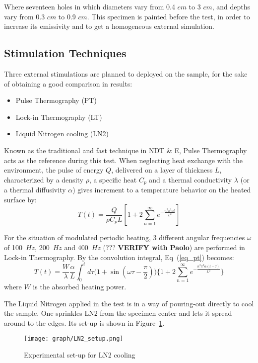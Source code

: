 \documentclass[]{spie}  %
\begin{document}
Where seventeen holes in which diameters vary from 0.4 $cm$  to 3 $cm$, and depths vary from 0.3 $cm$ to 0.9 $cm$. This specimen is painted before the test, in order to increase its emissivity and to get a homogeneous external simulation.

\subsection{Stimulation Techniques} %
\label{sub:stimulation_techniques}
Three external stimulations are planned to deployed on the sample, for the sake of  obtaining a good comparison in results: 
\begin{itemize}
   \item Pulse Thermography (PT) 
   \item Lock-in Thermography (LT)
   \item Liquid Nitrogen cooling (LN2)
\end{itemize}
Known as the traditional and fast technique in NDT \& E, Pulse Thermography acts as the reference during this test. When neglecting heat exchange with the environment, the pulse of energy $Q$, delivered on a layer of thickness $L$, characterized by a density $\rho$, a specific heat $C_p$ and a thermal conductivity $\lambda$ (or a thermal diffusivity $\alpha$) gives increment to a temperature behavior on the heated surface by:
\begin{equation}
   T(t) = \frac{Q}{\rho C_p L}[1+2\sum_{n=1}^{\infty} e^{-\frac{n^2 \pi ^2\alpha t}{L^2}}]
   \label{eq_pt}
\end{equation}

For the situation of modulated periodic heating, 3 different angular frequencies $\omega$ of 100~$Hz$, 200~$Hz$ and 400~$Hz$ (??? \textbf{VERIFY with Paolo}) are performed in Lock-in Thermography. By the convolution integral, Eq~(\ref{eq_pt}) becomes:
\begin{equation}
   T(t) = \frac{W}{\lambda}\frac{\alpha}{L}\int_0^t d\tau \Big(1+\sin(\omega \tau - \frac{\pi}{2})\Big)\Big\{1+2\sum_{n=1}^{\infty} e^{-\frac{n^2 \pi ^2\alpha(t-\tau)}{L^2}}\Big\}
\end{equation}
where $W$ is the absorbed heating power.

The Liquid Nitrogen applied in the test is in a way of pouring-out directly to cool the sample. One sprinkles LN2 from the specimen center and lets it spread around to the edges. Its set-up is shown in Figure~\ref{Exp_LN2}.

\begin{figure}[ht]
   \centering
   \texttt{[image: graph/LN2\_setup.png]}
   \caption{Experimental set-up for LN2 cooling}
   \label{Exp_LN2}
\end{figure}
\end{document}

